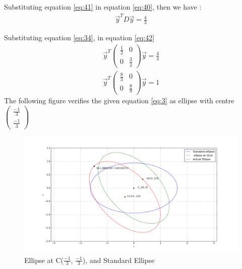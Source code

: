 \documentclass[journal,12pt,twocolumn]{IEEEtran}
\newcommand{\myvec}[1]{\ensuremath{\begin{pmatrix}#1\end{pmatrix}}}
\begin{document}
Substituting equation \eqref{eq:41} in equation \eqref{eq:40}, then we have :
\begin{align}
 \vec{y}^TD\vec{y}=\frac{4}{3}  \label{eq:42}
\end{align}

Substituting  equation \eqref{eq:34}, in equation \eqref{eq:42} 
\begin{align}
    \vec{y}^T \myvec{\frac{1}{2} & 0\\0 &\frac{3}{2}}\vec{y}=\frac{4}{3}
\end{align}
\begin{align}
    \vec{y}^T \myvec{\frac{8}{3} & 0\\0 &\frac{8}{9}}\vec{y}=1
\end{align}
The following figure verifies the given equation \eqref{eq:3} as ellipse with centre $\myvec{\frac{-1}{3}\\\frac{-1}{3}}$
\begin{figure}[!ht]
\centering
\includegraphics[width=\columnwidth]{fig.png}
\caption{Ellipse at C($\frac{-1}{3}$, $\frac{-1}{3}$), and Standard Ellipse}
\label{Fig}
\end{figure}
\end{document}

